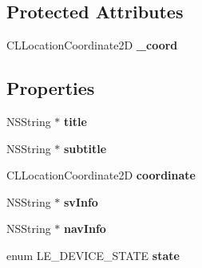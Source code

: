 \subsection*{Protected Attributes}
\begin{DoxyCompactItemize}
\item 
\hypertarget{interface_le_blutracker_device_af08a44f48893acf6baf13be4f5032d22}{}C\+L\+Location\+Coordinate2\+D {\bfseries \+\_\+coord}\label{interface_le_blutracker_device_af08a44f48893acf6baf13be4f5032d22}

\end{DoxyCompactItemize}
\subsection*{Properties}
\begin{DoxyCompactItemize}
\item 
\hypertarget{interface_le_blutracker_device_adb61aae7e9fae0938a21fd4f3fd1d3a4}{}N\+S\+String $\ast$ {\bfseries title}\label{interface_le_blutracker_device_adb61aae7e9fae0938a21fd4f3fd1d3a4}

\item 
\hypertarget{interface_le_blutracker_device_a4299ddd938701de06d79fe231a0beca5}{}N\+S\+String $\ast$ {\bfseries subtitle}\label{interface_le_blutracker_device_a4299ddd938701de06d79fe231a0beca5}

\item 
\hypertarget{interface_le_blutracker_device_a584e367f104415f292c545f64c675c94}{}C\+L\+Location\+Coordinate2\+D {\bfseries coordinate}\label{interface_le_blutracker_device_a584e367f104415f292c545f64c675c94}

\item 
\hypertarget{interface_le_blutracker_device_a6035155fc5803792a9cc6d783437f9ba}{}N\+S\+String $\ast$ {\bfseries sv\+Info}\label{interface_le_blutracker_device_a6035155fc5803792a9cc6d783437f9ba}

\item 
\hypertarget{interface_le_blutracker_device_a0983e05d6a84af1cc4288bf50160c35f}{}N\+S\+String $\ast$ {\bfseries nav\+Info}\label{interface_le_blutracker_device_a0983e05d6a84af1cc4288bf50160c35f}

\item 
\hypertarget{interface_le_blutracker_device_a6a8519cddf5a922aa2d6e993b3d13cb8}{}enum L\+E\+\_\+\+D\+E\+V\+I\+C\+E\+\_\+\+S\+T\+A\+T\+E {\bfseries state}\label{interface_le_blutracker_device_a6a8519cddf5a922aa2d6e993b3d13cb8}


\end{DoxyCompactItemize}
